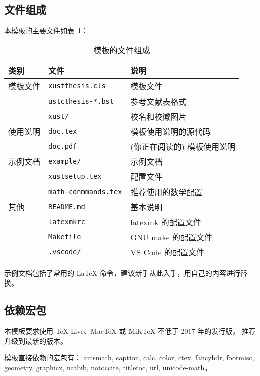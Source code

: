 \documentclass[a4paper]{ltxdoc}
\DeclareRobustCommand\file{\nolinkurl}
\DeclareRobustCommand\pkg{\textsf}
\begin{document}
\subsection{文件组成}
本模板的主要文件如表~\ref{tab:files}：
\begin{table}[htb]
  \centering\small
  \caption{模板的文件组成}
  \label{tab:files}
  \begin{tabular}{lll}
    \toprule
    类别     & 文件                      & 说明                        \\
    \midrule
    模板文件 & \file{xustthesis.cls}     & 模板文件                    \\
             & \file{ustcthesis-*.bst}   & 参考文献表格式              \\
             & \file{xust/}              & 校名和校徽图片              \\
    \midrule
    使用说明 & \file{doc.tex}            & 模板使用说明的源代码        \\
             & \file{doc.pdf}            & (你正在阅读的) 模板使用说明 \\
    \midrule
    示例文档 & \file{example/}           & 示例文档                    \\
             & \file{xustsetup.tex}      & 配置文件                    \\
             & \file{math-conmmands.tex} & 推荐使用的数学配置          \\
    \midrule
    其他     & \file{README.md}          & 基本说明                    \\
             & \file{latexmkrc}          & latexmk 的配置文件          \\
             & \file{Makefile}           & GNU make 的配置文件         \\
             & \file{.vscode/}           & VS Code 的配置文件          \\
    \bottomrule
  \end{tabular}
\end{table}

示例文档包括了常用的 \LaTeX{} 命令，建议新手从此入手，用自己的内容进行替换。


\subsection{依赖宏包}

本模板要求使用 TeX Live、MacTeX 或 MiKTeX 不低于 2017 年的发行版，
推荐升级到最新的版本。

模板直接依赖的宏包有：
\pkg{amsmath},
\pkg{caption},
\pkg{calc},
\pkg{color},
\pkg{ctex},
\pkg{fancyhdr},
\pkg{footmisc},
\pkg{geometry},
\pkg{graphicx},
\pkg{natbib},
\pkg{notoccite},
\pkg{titletoc},
\pkg{url},
\pkg{unicode-math}。
\end{document}
